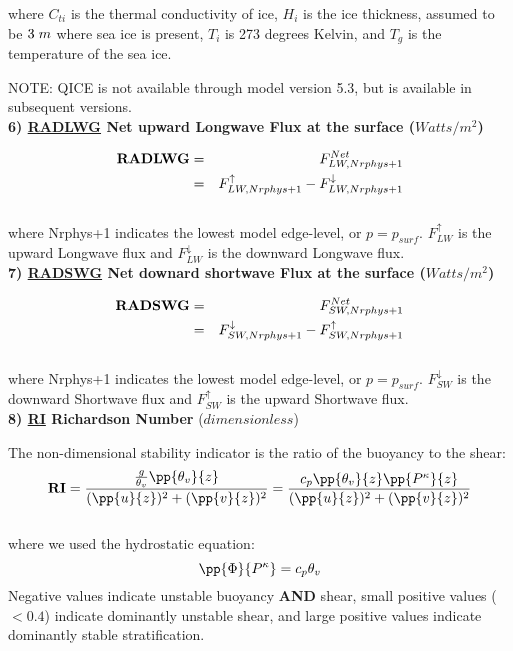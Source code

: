 where $C_{ti}$ is the thermal conductivity of ice, $H_i$ is the ice thickness, assumed to
be $3 \hspace{.1cm} m$ where sea ice is present, $T_i$ is 273 degrees Kelvin, and
$T_g$ is the temperature of the sea ice.

NOTE: QICE is not available through model version 5.3, but is available in subsequent versions.
\\
 

{\bf 6) \underline {RADLWG} Net upward Longwave Flux at the surface ($Watts/m^2$)}

\begin{eqnarray*}
{\bf RADLWG} & =  & F_{LW,Nrphys+1}^{Net} \\
             & =  & F_{LW,Nrphys+1}^\uparrow - F_{LW,Nrphys+1}^\downarrow
\end{eqnarray*}
\\
where Nrphys+1 indicates the lowest model edge-level, or $p = p_{surf}$.
$F_{LW}^\uparrow$ is
the upward Longwave flux and $F_{LW}^\downarrow$ is the downward Longwave flux.
\\

{\bf 7) \underline {RADSWG} Net downard shortwave Flux at the surface ($Watts/m^2$)}

\begin{eqnarray*}
{\bf RADSWG} & =  & F_{SW,Nrphys+1}^{Net} \\
             & =  & F_{SW,Nrphys+1}^\downarrow - F_{SW,Nrphys+1}^\uparrow
\end{eqnarray*}
\\
where Nrphys+1 indicates the lowest model edge-level, or $p = p_{surf}$.
$F_{SW}^\downarrow$ is
the downward Shortwave flux and $F_{SW}^\uparrow$ is the upward Shortwave flux.
\\


\noindent
{\bf 8)  \underline {RI} Richardson Number} ($dimensionless$)

\noindent
The non-dimensional stability indicator is the ratio of the buoyancy to the shear:
\[
{\bf RI} = { { {g \over \theta_v} \pp {\theta_v}{z} } \over { (\pp{u}{z})^2 + (\pp{v}{z})^2 } }
 =  {  {c_p \pp{\theta_v}{z} \pp{P^ \kappa}{z} } \over { (\pp{u}{z})^2 + (\pp{v}{z})^2 } }
\]
\\
where we used the hydrostatic equation: 
\[
{\pp{\Phi}{P^ \kappa}} = c_p \theta_v
\]
Negative values indicate unstable buoyancy {\bf{AND}} shear, small positive values ($<0.4$)
indicate dominantly unstable shear, and large positive values indicate dominantly stable
stratification.
\\

